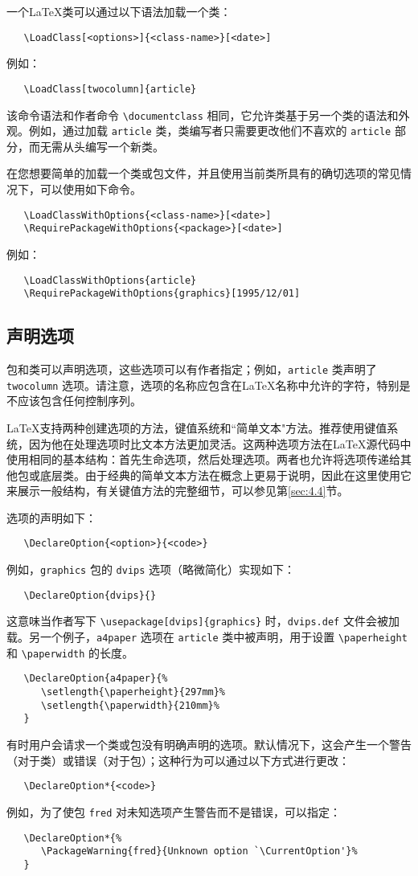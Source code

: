 \documentclass[12pt]{ltxguide}
\begin{document}
一个\LaTeX{}类可以通过以下语法加载一个类：
\begin{verbatim}
   \LoadClass[<options>]{<class-name>}[<date>]
\end{verbatim}
例如：
\begin{verbatim}
   \LoadClass[twocolumn]{article}
\end{verbatim}
该命令语法和作者命令 \verb|\documentclass| 相同，它允许类基于另一个类的语法和外观。例如，通过加载 \verb|article| 类，类编写者只需要更改他们不喜欢的 \verb|article| 部分，而无需从头编写一个新类。

在您想要简单的加载一个类或包文件，并且使用当前类所具有的确切选项的常见情况下，可以使用如下命令。
\begin{verbatim}
   \LoadClassWithOptions{<class-name>}[<date>]
   \RequirePackageWithOptions{<package>}[<date>]
\end{verbatim}
例如：
\begin{verbatim}
   \LoadClassWithOptions{article}
   \RequirePackageWithOptions{graphics}[1995/12/01]
\end{verbatim}

\subsection{声明选项}
包和类可以声明选项，这些选项可以有作者指定；例如，\verb|article| 类声明了 \verb|twocolumn| 选项。请注意，选项的名称应包含在\LaTeX{}名称中允许的字符，特别是不应该包含任何控制序列。

\LaTeX{}支持两种创建选项的方法，键值系统和``简单文本"方法。推荐使用键值系统，因为他在处理选项时比文本方法更加灵活。这两种选项方法在\LaTeX{}源代码中使用相同的基本结构：首先生命选项，然后处理选项。两者也允许将选项传递给其他包或底层类。由于经典的简单文本方法在概念上更易于说明，因此在这里使用它来展示一般结构，有关键值方法的完整细节，可以参见第\ref{sec:4.4}节。

选项的声明如下：
\begin{verbatim}
   \DeclareOption{<option>}{<code>}
\end{verbatim}
例如，\verb|graphics| 包的 \verb|dvips| 选项（略微简化）实现如下：
\begin{verbatim}
   \DeclareOption{dvips}{}
\end{verbatim}
这意味当作者写下 \verb|\usepackage[dvips]{graphics}| 时，\verb|dvips.def| 文件会被加载。另一个例子，\verb|a4paper| 选项在 \verb|article| 类中被声明，用于设置 \verb|\paperheight| 和 \verb|\paperwidth| 的长度。
\begin{verbatim}
   \DeclareOption{a4paper}{%
      \setlength{\paperheight}{297mm}%
      \setlength{\paperwidth}{210mm}%
   }
\end{verbatim}
有时用户会请求一个类或包没有明确声明的选项。默认情况下，这会产生一个警告（对于类）或错误（对于包）；这种行为可以通过以下方式进行更改：
\begin{verbatim}
   \DeclareOption*{<code>}
\end{verbatim}
例如，为了使包 \verb|fred| 对未知选项产生警告而不是错误，可以指定：
\begin{verbatim}
   \DeclareOption*{%
      \PackageWarning{fred}{Unknown option `\CurrentOption'}%
   }
\end{verbatim}
\end{document}
